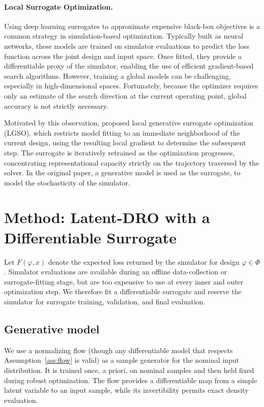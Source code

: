 \documentclass[11pt]{article}
\newcommand{\Phibox}{\Phi}
\newcommand{\design}{\varphi}
\begin{document}
\paragraph{Local Surrogate Optimization.}
Using deep learning surrogates to approximate expensive black-box objectives is a common strategy in simulation-based optimization. Typically built as neural networks, these models are trained on simulator evaluations to predict the loss function across the joint design and input space. Once fitted, they provide a differentiable proxy of the simulator, enabling the use of efficient gradient-based search algorithms. However, training a global models can be challenging, especially in high-dimensional spaces. Fortunately, because the optimizer requires only an estimate of the search direction at the current operating point, global accuracy is not strictly necessary.

Motivated by this observation, \cite{shirobokov2020} proposed local generative surrogate optimization (LGSO), which  restricts model fitting to an immediate neighborhood of the current design, using the resulting local gradient to determine the subsequent step. The surrogate is iteratively retrained as the optimization progresses, concentrating representational capacity strictly on the trajectory traversed by the solver. In the original paper, a generative model is used as the surrogate, to model the stochasticity of the simulator. 


\section{Method: Latent-DRO with a Differentiable Surrogate}
\label{sec:method}

Let $F(\design,x)$ denote the expected loss returned by the simulator for design
$\design\in\Phibox$. Simulator evaluations are available during an offline data-collection
or surrogate-fitting stage, but are too expensive to use at every inner and outer optimization
step. We therefore fit a differentiable surrogate and reserve the simulator for surrogate
training, validation, and final evaluation.

\subsection{Generative model}

We use a normalizing flow (though any differentiable model that respects
Assumption~\ref{ass:flow} is valid) as a sample generator for the nominal input distribution. It is
trained once, a priori, on nominal samples and then held fixed during robust optimization.
The flow provides a differentiable map from a simple latent variable to an input sample, while
its invertibility permits exact density evaluation.
\end{document}
